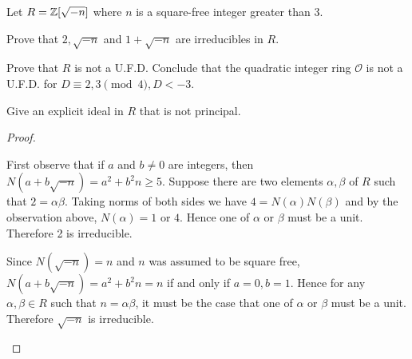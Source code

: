 \documentclass[10pt]{amsart}
\begin{document}
\begin{thm}
  \label{Ex4}
  Let $R = \mathbb{Z}[\sqrt{-n}]$ where $n$ is a square-free integer greater than 3.
  \begin{alphaenum}
  \item 
    Prove that $2, \sqrt{-n}$ and $1 + \sqrt{-n}$ are irreducibles in $R$.
  \item
    Prove that $R$ is not a U.F.D.  
    Conclude that the quadratic integer ring $\mathcal{O}$ is not a U.F.D. for $D \equiv 2,3 \pmod{4}, D < -3$.
  \item
    Give an explicit ideal in $R$ that is not principal.
  \end{alphaenum}
  \begin{proof}
    \begin{alphaenum}
    \item 
      First observe that if $a$ and $b \not = 0$ are integers, then $N(a + b\sqrt{-n}) = a^2 + b^2n \geq 5.$
      Suppose there are two elements $\alpha, \beta$ of $R$ such that $2 = \alpha\beta$.
      Taking norms of both sides we have $4 = N(\alpha)N(\beta)$ and by the observation above, $N(\alpha) = 1$ or $4$.  
      Hence one of $\alpha$ or $\beta$ must be a unit.
      Therefore 2 is irreducible.
      
      Since $N(\sqrt{-n}) = n$ and $n$ was assumed to be square free, $N(a + b\sqrt{-n}) = a^2 + b^2n = n$ if and only if $a=0, b=1$.
      Hence for any $\alpha,\beta \in R$ such that $n = \alpha\beta$, it must be the case that one of $\alpha$ or $\beta$ must be a unit.
      Therefore $\sqrt{-n}$ is irreducible.
      

\end{alphaenum}
\end{proof}
\end{thm}
\end{document}
